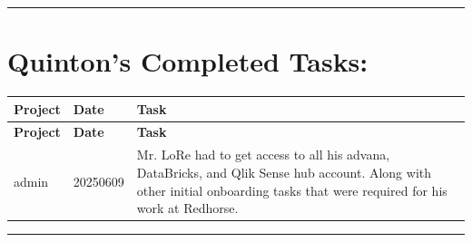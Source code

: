 \documentclass{article}
\begin{document}
\vspace{0.5cm}
\hrule
\vspace{1cm}


\section*{\centering \textbf{ Quinton's Completed Tasks: }}
\label{sec:quinton_tasks}


\begin{longtable}{@{}p{2.5cm} p{2.5cm} p{9cm}@{}}
\toprule
\textbf{ Project } & \textbf{ Date } & \textbf{ Task } \\
\midrule
\endfirsthead

\toprule
\textbf{ Project } & \textbf{ Date } & \textbf{ Task } \\
\midrule
\endhead

\bottomrule
\endfoot


admin & 20250609 & Mr. LoRe had to get access to all his advana, DataBricks, and Qlik Sense hub account. Along with other initial onboarding tasks that were required for his work at Redhorse. \\


\end{longtable}


\vspace{0.5cm}
\hrule
\vspace{1cm}
\end{document}

